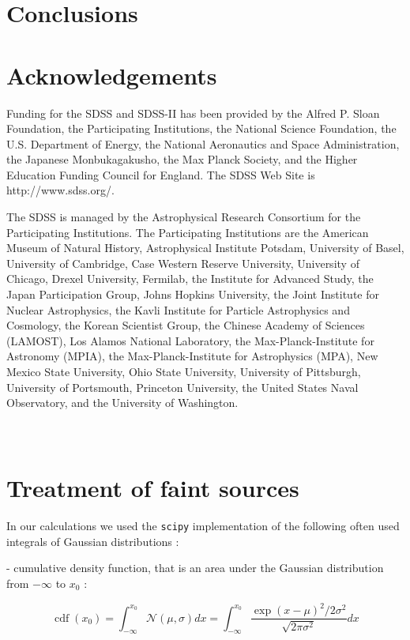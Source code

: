 \documentclass[fleqn,usenatbib]{mnras}  %
\DeclareMathOperator\cdf{cdf}
\begin{document}
\section{Conclusions}
\label{sec:conclusions}



\section*{Acknowledgements}

Funding for the SDSS and SDSS-II has been provided by the Alfred P. Sloan Foundation, the Participating Institutions, the National Science Foundation, the U.S. Department of Energy, the National Aeronautics and Space Administration, the Japanese Monbukagakusho, the Max Planck Society, and the Higher Education Funding Council for England. The SDSS Web Site is http://www.sdss.org/.

The SDSS is managed by the Astrophysical Research Consortium for the Participating Institutions. The Participating Institutions are the American Museum of Natural History, Astrophysical Institute Potsdam, University of Basel, University of Cambridge, Case Western Reserve University, University of Chicago, Drexel University, Fermilab, the Institute for Advanced Study, the Japan Participation Group, Johns Hopkins University, the Joint Institute for Nuclear Astrophysics, the Kavli Institute for Particle Astrophysics and Cosmology, the Korean Scientist Group, the Chinese Academy of Sciences (LAMOST), Los Alamos National Laboratory, the Max-Planck-Institute for Astronomy (MPIA), the Max-Planck-Institute for Astrophysics (MPA), New Mexico State University, Ohio State University, University of Pittsburgh, University of Portsmouth, Princeton University, the United States Naval Observatory, and the University of Washington. 

\appendix
\section{\\ Treatment of faint sources}
\label{App:AppendixA}

In our calculations we used the  \verb|scipy| implementation of 
the following often used integrals of Gaussian distributions : 

- cumulative density function, that is an area under the Gaussian distribution from $-\infty$ to $x_{0}$ :

\begin{equation}
\cdf(x_{0}) = \int_{-\infty}^{x_{0}}{\mathcal{N}(\mu,\sigma)dx} = \int_{-\infty}^{x_{0}}{\frac{\exp{(x-\mu)^{2} / 2\sigma^{2}}}{\sqrt{2\pi\sigma^{2}}} dx}
\end{equation}
\end{document}
